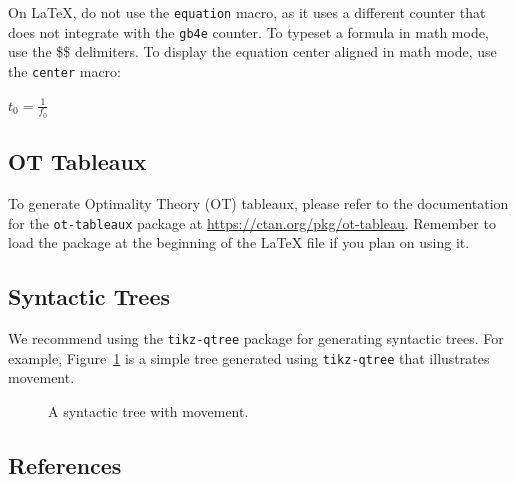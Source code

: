 \documentclass[11pt]{article}
\begin{document}
On \LaTeX{}, do not use the \texttt{equation} macro, as it uses a different counter that does not integrate with the \texttt{gb4e} counter. To typeset a formula in math mode, use the \$\textellipsis \$ delimiters. To display the equation center aligned in math mode, use the \verb|center| macro:

\begin{center}
    $t_0 = \frac{1}{f_0}$
\end{center}


\subsection{OT Tableaux}

To generate Optimality Theory (OT) tableaux, please refer to the documentation for the \texttt{ot-tableaux} package at \url{https://ctan.org/pkg/ot-tableau}. Remember to load the package at the beginning of the \LaTeX{} file if you plan on using it.


\subsection{Syntactic Trees}

We recommend using the \texttt{tikz-qtree} package for generating syntactic trees. For example, Figure~\ref{fig:tree} is a simple tree generated using \texttt{tikz-qtree} that illustrates movement.

\begin{figure}[t]
        \centering
        \footnotesize
        \caption{A syntactic tree with movement.}
        \label{fig:tree}
\end{figure}


\subsection{References}
\end{document}
